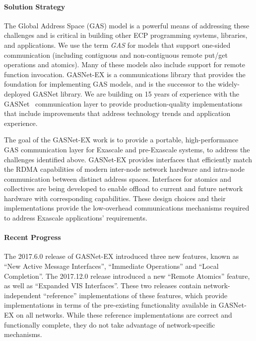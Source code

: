 \paragraph{Solution Strategy}

The Global Address Space (GAS) model is a powerful means of addressing these
challenges and is critical in building other ECP programming systems,
libraries, and applications.  We use the term {\em GAS} for models that support
one-sided communication (including contiguous and non-contiguous remote put/get
operations and atomics). Many of these models also include support for remote function invocation.
GASNet-EX is a communications library that provides the foundation for implementing
GAS models, and is the successor to the widely-deployed GASNet library.
We are building on 15 years of experience with the GASNet~\cite{gasnet-spec,gasnet-site}
communication layer to provide production-quality implementations that include
improvements that address
technology trends and application experience.  

The goal of the GASNet-EX work is to provide a portable, high-performance GAS
communication layer for Exascale and pre-Exascale systems, to address the challenges
identified above.
GASNet-EX provides interfaces that efficiently match the RDMA capabilities of modern
inter-node network hardware and intra-node communication between distinct address spaces.
Interfaces for atomics and collectives are being developed to enable offload to current
and future network hardware with corresponding capabilities.
These design choices and their implementations provide the low-overhead communications
mechanisms required to address Exascale applications' requirements.


\paragraph{Recent Progress}

The 2017.6.0 release of GASNet-EX introduced three new features, known as ``New Active
Message Interfaces'', ``Immediate Operations'' and ``Local Completion''.  The 2017.12.0 release
introduced a new ``Remote Atomics'' feature, as well as ``Expanded VIS Interfaces''.  
These two releases contain network-independent
``reference'' implementations of these features, which provide implementations in terms of
the pre-existing functionality available in GASNet-EX on all networks.  While these
reference implementations are correct and functionally complete, they do not take advantage
of network-specific mechanisms.

